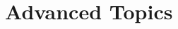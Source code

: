 % 
% 
% 
% 
% 
% 

% 
% 
% 
% 
% 
% 
% 
% 
% 
% 
% 
% 
% 

\part{Advanced Topics}

% 
% 
% 
% 
% 
% 
% 
% 
% 
% 
% 
% 
% 
% 

% 
% 
% 

% 
% 
% 
% 
% 
% 
% 
% 

